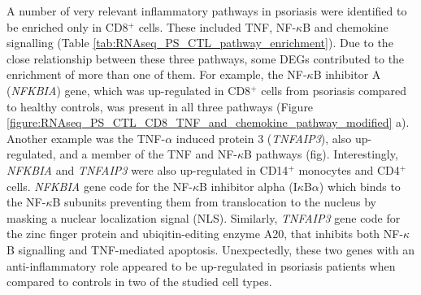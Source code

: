 A number of very relevant inflammatory pathways in psoriasis were identified to be enriched only in CD8$^+$ cells. These included TNF, NF-$\kappa$B and chemokine signalling (Table \ref{tab:RNAseq_PS_CTL_pathway_enrichment}). Due to the close relationship between these three pathways, some DEGs contributed to the enrichment of more than one of them. For example, the NF-$\kappa$B inhibitor A (\textit{NFKBIA}) gene, which was up-regulated in CD8$^+$ cells from psoriasis compared to healthy controls, was present in all three pathways (Figure \ref{figure:RNAseq_PS_CTL_CD8_TNF_and_chemokine_pathway_modified} a). Another example was the TNF-$\alpha$ induced protein 3 (\textit{TNFAIP3}), also up-regulated, and a member of the TNF and NF-$\kappa$B pathways (fig). Interestingly, \textit{NFKBIA} and \textit{TNFAIP3} were also up-regulated in CD14$^+$ monocytes and CD4$^+$ cells. \textit{NFKBIA} gene code for the NF-$\kappa$B inhibitor alpha (I$\kappa$B$\alpha$) which binds to the NF-$\kappa$B subunits preventing them from translocation to the nucleus by masking a nuclear localization signal (NLS). Similarly, \textit{TNFAIP3} gene code for the zinc finger protein and ubiqitin-editing enzyme A20, that inhibits both NF-$\kappa$B signalling and TNF-mediated apoptosis. Unexpectedly, these two genes with an anti-inflammatory role appeared to be up-regulated in psoriasis patients when compared to controls in two of the studied cell types. 



